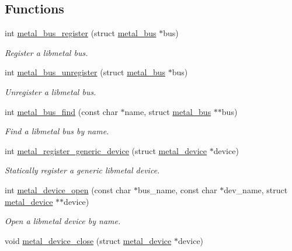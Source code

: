 \subsection*{Functions}
\begin{DoxyCompactItemize}
\item 
int \hyperlink{group__device_ga03f91ef6ff4aa5d6b6826806cccaabc3}{metal\+\_\+bus\+\_\+register} (struct \hyperlink{structmetal__bus}{metal\+\_\+bus} $\ast$bus)
\begin{DoxyCompactList}\small\item\em Register a libmetal bus. \end{DoxyCompactList}\item 
int \hyperlink{group__device_gafcc93056fa5993c770561e0e4865e623}{metal\+\_\+bus\+\_\+unregister} (struct \hyperlink{structmetal__bus}{metal\+\_\+bus} $\ast$bus)
\begin{DoxyCompactList}\small\item\em Unregister a libmetal bus. \end{DoxyCompactList}\item 
int \hyperlink{group__device_ga2f923b8e34d918ed5b994c0f4c03f130}{metal\+\_\+bus\+\_\+find} (const char $\ast$name, struct \hyperlink{structmetal__bus}{metal\+\_\+bus} $\ast$$\ast$bus)
\begin{DoxyCompactList}\small\item\em Find a libmetal bus by name. \end{DoxyCompactList}\item 
int \hyperlink{group__device_ga06f83c87ed96dae8bd87ffdcc66455c4}{metal\+\_\+register\+\_\+generic\+\_\+device} (struct \hyperlink{structmetal__device}{metal\+\_\+device} $\ast$device)
\begin{DoxyCompactList}\small\item\em Statically register a generic libmetal device. \end{DoxyCompactList}\item 
int \hyperlink{group__device_ga9956a31f8b3ad95ce02c917a4c6d2258}{metal\+\_\+device\+\_\+open} (const char $\ast$bus\+\_\+name, const char $\ast$dev\+\_\+name, struct \hyperlink{structmetal__device}{metal\+\_\+device} $\ast$$\ast$device)
\begin{DoxyCompactList}\small\item\em Open a libmetal device by name. \end{DoxyCompactList}\item 
void \hyperlink{group__device_ga5baa99ff09fd6bd2b49c4739b28d4ed2}{metal\+\_\+device\+\_\+close} (struct \hyperlink{structmetal__device}{metal\+\_\+device} $\ast$device)

\end{DoxyCompactItemize}
